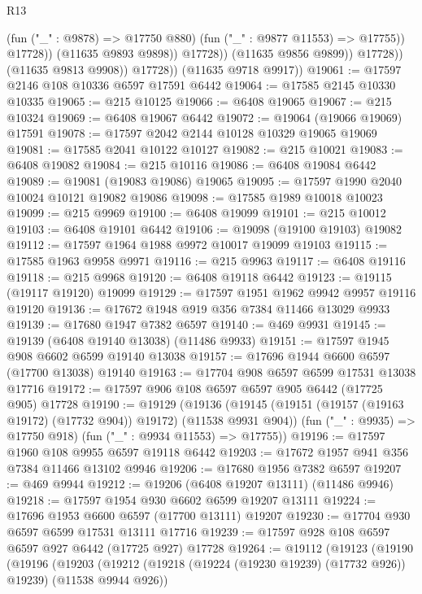 \begin{lexlean}{R13}
\begin{coremodule}
                              (fun ("_" : @9878) => @17750 @880)
                              (fun ("_" : @9877 @11553) => @17755))
                            @17728))
                        (@11635 @9893 @9898))
                      @17728))
                  (@11635 @9856 @9899))
                @17728))
            (@11635 @9813 @9908))
          @17728))
      (@11635 @9718 @9917))
@19061 := @17597 @2146 @108 @10336 @6597 @17591 @6442
@19064 := @17585 @2145 @10330 @10335
@19065 := @215 @10125
@19066 := @6408 @19065
@19067 := @215 @10324
@19069 := @6408 @19067 @6442
@19072 := @19064 (@19066 @19069) @17591
@19078 := @17597 @2042 @2144 @10128 @10329 @19065 @19069
@19081 := @17585 @2041 @10122 @10127
@19082 := @215 @10021
@19083 := @6408 @19082
@19084 := @215 @10116
@19086 := @6408 @19084 @6442
@19089 := @19081 (@19083 @19086) @19065
@19095 := @17597 @1990 @2040 @10024 @10121 @19082 @19086
@19098 := @17585 @1989 @10018 @10023
@19099 := @215 @9969
@19100 := @6408 @19099
@19101 := @215 @10012
@19103 := @6408 @19101 @6442
@19106 := @19098 (@19100 @19103) @19082
@19112 := @17597 @1964 @1988 @9972 @10017 @19099 @19103
@19115 := @17585 @1963 @9958 @9971
@19116 := @215 @9963
@19117 := @6408 @19116
@19118 := @215 @9968
@19120 := @6408 @19118 @6442
@19123 := @19115 (@19117 @19120) @19099
@19129 := @17597 @1951 @1962 @9942 @9957 @19116 @19120
@19136 := @17672 @1948 @919 @356 @7384 @11466 @13029 @9933
@19139 := @17680 @1947 @7382 @6597
@19140 := @469 @9931
@19145 := @19139 (@6408 @19140 @13038) (@11486 @9933)
@19151 := @17597 @1945 @908 @6602 @6599 @19140 @13038
@19157 := @17696 @1944 @6600 @6597 (@17700 @13038) @19140
@19163 := @17704 @908 @6597 @6599 @17531 @13038 @17716
@19172 := @17597 @906 @108 @6597 @6597 @905 @6442 (@17725 @905) @17728
@19190 := @19129
    (@19136
      (@19145 (@19151 (@19157 (@19163 @19172) (@17732 @904)) @19172) (@11538 @9931 @904))
      (fun ("_" : @9935) => @17750 @918)
      (fun ("_" : @9934 @11553) => @17755))
@19196 := @17597 @1960 @108 @9955 @6597 @19118 @6442
@19203 := @17672 @1957 @941 @356 @7384 @11466 @13102 @9946
@19206 := @17680 @1956 @7382 @6597
@19207 := @469 @9944
@19212 := @19206 (@6408 @19207 @13111) (@11486 @9946)
@19218 := @17597 @1954 @930 @6602 @6599 @19207 @13111
@19224 := @17696 @1953 @6600 @6597 (@17700 @13111) @19207
@19230 := @17704 @930 @6597 @6599 @17531 @13111 @17716
@19239 := @17597 @928 @108 @6597 @6597 @927 @6442 (@17725 @927) @17728
@19264 := @19112
    (@19123
      (@19190
        (@19196
          (@19203
            (@19212 (@19218 (@19224 (@19230 @19239) (@17732 @926)) @19239) (@11538 @9944 @926))

\end{coremodule}
\end{lexlean}
